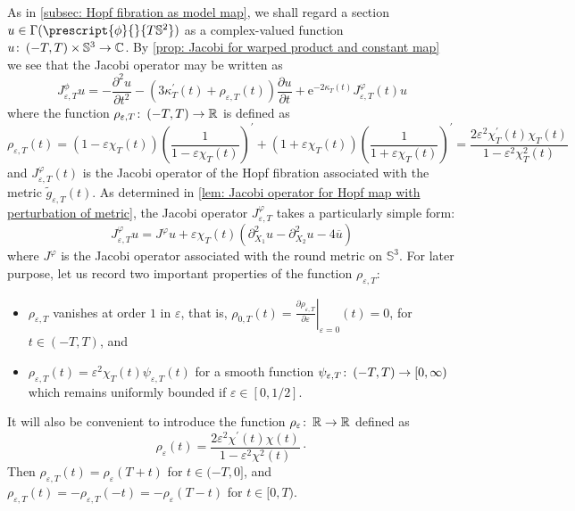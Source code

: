 \documentclass{article}
\numberwithin{equation}{section}        %
\theoremstyle{bfnote}
\theoremstyle{definition}
\theoremstyle{bfremark}
\newcommand{\col}{\colon \thinspace}        %
\newcommand{\R}{\mathbb{R}}                 %
\newcommand{\C}{\mathbb{C}}                 %
\newcommand{\Sp}{\mathbb{S}}                %
\begin{document}
As in \cref{subsec: Hopf fibration as model map}, we shall regard a section $u \in \Gamma(\prescript{\phi}{}{T\Sp^2})$ as a complex-valued function $u \col (-T,T) \times \Sp^3 \rightarrow \C$. By \cref{prop: Jacobi for warped product and constant map} we see that the Jacobi operator may be written as
\begin{equation*}
    J^\phi_{\varepsilon,T} u = - \frac{\partial^2u}{\partial t^2} - (3 \kappa_T^\prime(t) + \rho_{\varepsilon,T}(t)) \frac{\partial u}{\partial t} + \mathrm{e}^{-2\kappa_T(t)}J^\varphi_{\varepsilon,T}(t) u
\end{equation*}
where the function $\rho_{\varepsilon,T} \col (-T,T) \rightarrow \R$ is defined as
\begin{equation}        \label{eq: rho epsilon T}
    \rho_{\varepsilon,T}(t) = (1-\varepsilon\chi_T(t)) \left( \frac{1}{1-\varepsilon \chi_T(t)}\right)^\prime + (1+\varepsilon\chi_T(t)) \left( \frac{1}{1+\varepsilon \chi_T(t)}\right)^\prime = \frac{2\varepsilon^2 \chi_T^\prime(t) \chi_T(t)}{1-\varepsilon^2 \chi^2_T(t)} 
\end{equation}
and $J^\varphi_{\varepsilon,T}(t)$ is the Jacobi operator of the Hopf fibration associated with the metric $\widetilde{g}_{\varepsilon,T}(t)$. As determined in \cref{lem: Jacobi operator for Hopf map with perturbation of metric}, the Jacobi operator $J^\varphi_{\varepsilon,T}$ takes a particularly simple form:
\begin{equation*}
    J^\varphi_{\varepsilon,T}u = J^\varphi u + \varepsilon \chi_T(t) (\partial_{X_1}^2u - \partial_{X_2}^2u - 4 \overline{u}) 
\end{equation*}
where $J^\varphi$ is the Jacobi operator associated with the round metric on $\Sp^3$. For later purpose, let us record two important properties of the function $\rho_{\varepsilon,T}$:
\begin{itemize}
    \item $\rho_{\varepsilon,T}$ vanishes at order $1$ in $\varepsilon$, that is, $\rho_{0,T}(t) = \left. \frac{\partial \rho_{\varepsilon,T}}{\partial \varepsilon} \right|_{\varepsilon=0}(t) = 0$, for $t \in (-T,T)$, and

    \item $\rho_{\varepsilon,T}(t) = \varepsilon^2 \chi_T(t) \psi_{\varepsilon,T}(t)$ for a smooth function $\psi_{\varepsilon,T} \col (-T,T) \rightarrow [0,\infty)$ which remains uniformly bounded if $\varepsilon \in [0,1/2]$.
\end{itemize}
It will also be convenient to introduce the function $\rho_\varepsilon \col \R \rightarrow \R$ defined as
\begin{equation*}
    \rho_\varepsilon(t) = \frac{2 \varepsilon^2 \chi^\prime(t) \chi(t)}{1-\varepsilon^2\chi^2(t)} \cdot
\end{equation*}
Then $\rho_{\varepsilon,T}(t) = \rho_\varepsilon(T+t)$ for $t \in (-T,0]$, and $\rho_{\varepsilon,T}(t) = - \rho_{\varepsilon,T}(-t) = - \rho_\varepsilon(T-t)$ for $t \in [0,T)$.
\end{document}
